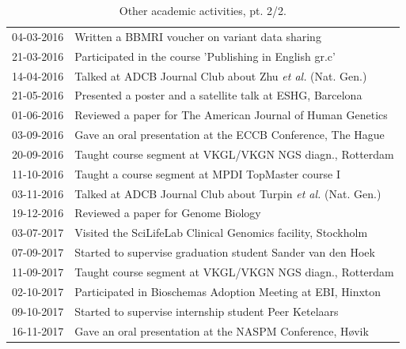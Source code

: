 \begin{appendices}
\begin{table}
\begin{tabulary}{\linewidth}{LL}
			\rule{0pt}{2.5ex}\mbox{04-03-2016} & Written a BBMRI voucher on variant data sharing\\
			\rule{0pt}{2.5ex}\mbox{21-03-2016} & Participated in the course 'Publishing in English gr.c' \\
			\rule{0pt}{2.5ex}\mbox{14-04-2016} & Talked at ADCB Journal Club about Zhu \textsl{et al.} (Nat. Gen.) \\
			\rule{0pt}{2.5ex}\mbox{21-05-2016} & Presented a poster and a satellite talk at ESHG, Barcelona \\
			\rule{0pt}{2.5ex}\mbox{01-06-2016} & Reviewed a paper for The American Journal of Human Genetics \\
			\rule{0pt}{2.5ex}\mbox{03-09-2016} & Gave an oral presentation at the ECCB Conference, The Hague \\
			\rule{0pt}{2.5ex}\mbox{20-09-2016} & Taught course segment at VKGL/VKGN NGS diagn., Rotterdam \\
			\rule{0pt}{2.5ex}\mbox{11-10-2016} & Taught a course segment at MPDI TopMaster course I \\
			\rule{0pt}{2.5ex}\mbox{03-11-2016} & Talked at ADCB Journal Club about Turpin \textsl{et al.} (Nat. Gen.) \\
			\rule{0pt}{2.5ex}\mbox{19-12-2016} & Reviewed a paper for Genome Biology \\
			\rule{0pt}{2.5ex}\mbox{03-07-2017} & Visited the SciLifeLab Clinical Genomics facility, Stockholm \\
			\rule{0pt}{2.5ex}\mbox{07-09-2017} & Started to supervise graduation student Sander van den Hoek\\
			\rule{0pt}{2.5ex}\mbox{11-09-2017} & Taught course segment at VKGL/VKGN NGS diagn., Rotterdam \\
			\rule{0pt}{2.5ex}\mbox{02-10-2017} & Participated in Bioschemas Adoption Meeting at EBI, Hinxton \\
			\rule{0pt}{2.5ex}\mbox{09-10-2017} & Started to supervise internship student Peer Ketelaars\\
			\rule{0pt}{2.5ex}\mbox{16-11-2017} & Gave an oral presentation at the NASPM Conference, Høvik \\
			\hline
		\end{tabulary}
		\caption[Other academic activities, pt. 2/2]{Other academic activities, pt. 2/2.}
		\label{table:appendix_activities_2}
	\end{table}
	
\end{appendices}

